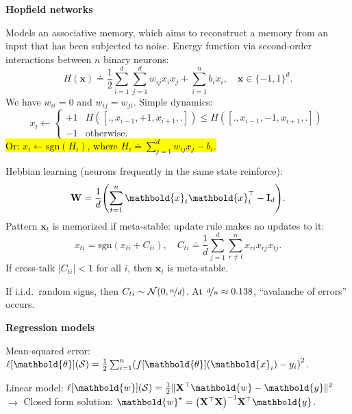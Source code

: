 \documentclass[10pt]{article}
\newenvironment{topic}[1]
{\textbf{\sffamily \footnotesize \colorbox{black}{\rlap{\textbf{\textcolor{white}{#1}}}\hspace{\linewidth}\hspace{-2\fboxsep}}}}
{}
\newenvironment{subtopic}[1]
{\begin{center}\textbf{\footnotesize \sffamily #1}\end{center}}
{}
\renewcommand{\mat}[1]{\ensuremath{\mathbf{#1}}}
\renewcommand{\vec}[1]{\ensuremath{\mathbold{#1}}}
\begin{document}
\begin{multicols*}{3}
\begin{topic}{Connectionism}
        \begin{subtopic}{Hopfield networks}
            Models an associative memory, which aims to reconstruct a memory from an input that has been subjected to noise. Energy function via second-order interactions between $n$ binary neurons: \[
                H(\vec{x}) \doteq \frac{1}{2} \sum_{i=1}^{d} \sum_{j=1}^{d} w_{ij}x_ix_j + \sum_{i=1}^{n} b_ix_i, \quad \vec{x} \in \{ -1, 1 \}^d.
            \]
            We have $w_{ii} = 0$ and $w_{ij} = w_{ji}$. Simple dynamics: \[
                x_i \gets \begin{cases}
                    +1 & H([., x_{i-1}, +1, x_{i+1}, .]) \leq H([., x_{i-1}, -1, x_{i+1}, .]) \\
                    -1 & \mathrm{otherwise}.
                \end{cases}
            \]
            \hl{Or: $x_i \gets \mathrm{sgn}(H_i)$, where $H_i \doteq \sum_{j=1}^{d} w_{ij} x_j - b_i$.}

            Hebbian learning (neurons frequently in the same state reinforce): \[
                \mat{W} = \frac{1}{d} \lft( \sum_{t=1}^{n} \vec{x}_t \transpose{\vec{x}_t} - \mat{I}_d \rgt).
            \]
            Pattern $\vec{x}_t$ is memorized if meta-stable: update rule makes no updates to it: \[
                x_{ti} = \mathrm{sgn}(x_{ti} + C_{ti}), \quad C_{ti} \doteq \frac{1}{d} \sum_{j=1}^{d} \sum_{r\neq t}^{n} x_{ri}x_{rj}x_{tj}.
            \]
            If cross-talk $|C_{ti}| < 1$ for all $i$, then $\vec{x}_t$ is meta-stable.

            If i.i.d.\ random signs, then $C_{ti} \sim \mathcal{N}(0, \nicefrac{n}{d})$. At
            $\nicefrac{d}{n} \approx 0.138$, ``avalanche of errors'' occurs.
        \end{subtopic}

    \end{topic}

    \begin{topic}{Feedforward networks}

        \begin{subtopic}{Regression models}
            Mean-squared error: $\ell[\vec{\theta}](\mathcal{S}) = \frac{1}{2} \sum_{i=1}^{n} \lft( f[\vec{\theta}](\vec{x}_i) - y_i \rgt)^2$.

            Linear model: $\ell[\vec{w}](\mathcal{S}) = \frac{1}{2} \| \transpose{\mat{X}} \vec{w} - \vec{y}
                \|^2$ $\to$ Closed form solution: $\vec{w}^\star = \inv{\lft( \transpose{\mat{X}}\mat{X}
                    \rgt)}\transpose{\mat{X}} \vec{y}$.


\end{subtopic}
\end{topic}
\end{multicols*}
\end{document}
